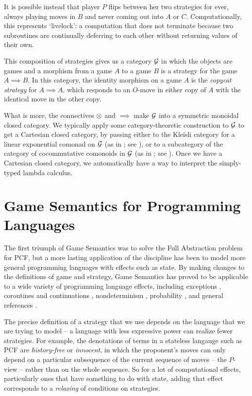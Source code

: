 \documentclass[11pt]{report}
\begin{document}
It is possible instead that player $P$ flips between her two strategies for ever, always playing moves in $B$ and never coming out into $A$ or $C$.  
Computationally, this represents `livelock': a computation that does not terminate because two subroutines are continually deferring to each other without returning values of their own.

This composition of strategies gives us a category $\mathcal G$ in which the objects are games and a morphism from a game $A$ to a game $B$ is a strategy for the game $A\implies B$.  
In this category, the identity morphism on a game $A$ is the \emph{copycat strategy} for $A\implies A$, which responds to an $O$-move in either copy of $A$ with the identical move in the other copy.

What is more, the connectives $\otimes$ and $\implies$ make $\mathcal G$ into a symmetric monoidal closed category.  
We typically apply some category-theoretic construction to $\mathcal G$ to get a Cartesian closed category, by passing either to the Kleisli category for a linear exponential comonad on $\mathcal G$ (as in \cite{ajmPcf}; see \cite{SchalkWhatIs}), or to a subcategory of the category of cocommutative comonoids in $\mathcal G$ (as in \cite{hoPcf,SamsonGuyIAActive}; see \cite[.2]{RusssThesis}).
Once we have a Cartesian closed category, we automatically have a way to interpret the simply-typed lambda calculus.

\section{Game Semantics for Programming Languages}

The first triumph of Game Semantics was to solve the Full Abstraction problem for PCF, but a more lasting application of the discipline has been to model more general programming languages with effects such as state.
By making changes to the definitions of game and strategy, Game Semantics has proved to be applicable to a wide variety of programming language effects, including exceptions \cite{LLi}, coroutines and continuations \cite{FunctionalProgramsAsCoroutines}, nondeterminism \cite{mcCHFiniteND}, probability \cite{DanosHarmer}, and general references \cite{HondaMcCusker}.

The precise definition of a strategy that we use depends on the language that we are trying to model -- a language with less expressive power can realize fewer strategies.  
For example, the denotations of terms in a stateless langauge such as PCF are \emph{history-free} or \emph{innocent}, in which the proponent's moves can only depend on a particular subsequence of the current sequence of moves -- the $P$-view -- rather than on the whole sequence.
So for a lot of computational effects, particularly ones that have something to do with state, adding that effect corresponds to a \emph{relaxing} of conditions on strategies.
\end{document}
